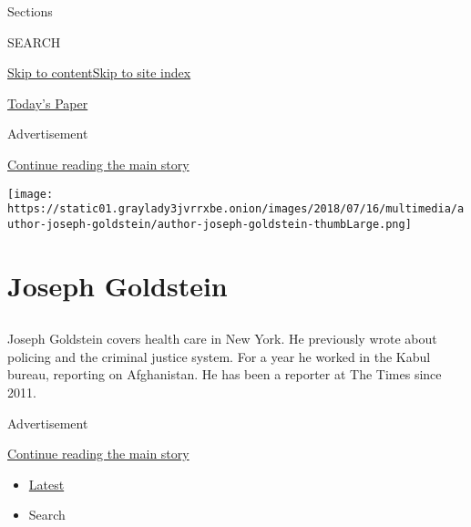 Sections

SEARCH

\protect\hyperlink{site-content}{Skip to
content}\protect\hyperlink{site-index}{Skip to site index}

\href{https://myaccount.nytimes3xbfgragh.onion/auth/login?response_type=cookie\&client_id=vi}{}

\href{https://www.nytimes3xbfgragh.onion/section/todayspaper}{Today's
Paper}

Advertisement

\protect\hyperlink{after-top}{Continue reading the main story}

\texttt{[image: https://static01.graylady3jvrrxbe.onion/images/2018/07/16/multimedia/author-joseph-goldstein/author-joseph-goldstein-thumbLarge.png]}

\hypertarget{joseph-goldstein}{%
\section{Joseph Goldstein}\label{joseph-goldstein}}

\subsection{}

Joseph Goldstein covers health care in New York. He previously wrote
about policing and the criminal justice system. For a year he worked in
the Kabul bureau, reporting on Afghanistan. He has been a reporter at
The Times since 2011.

Advertisement

\protect\hyperlink{after-mid1}{Continue reading the main story}

\begin{itemize}
\tightlist
\item
  \protect\hyperlink{stream-panel}{Latest}
\item
  Search
\end{itemize}

